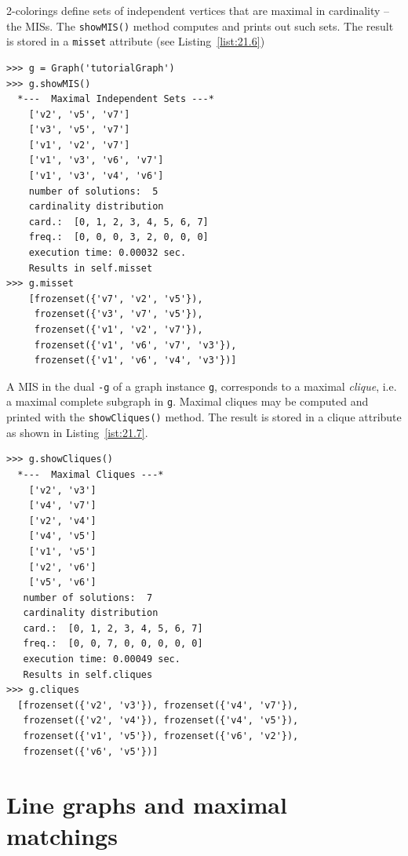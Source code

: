 2-colorings define sets of independent vertices that are maximal in cardinality --the MISs. The \texttt{showMIS()} method  computes and prints out such sets. The result is stored in a \texttt{misset} attribute (see Listing~\vref{list:21.6})
\begin{lstlisting}[caption={Computing and printing the maximal independent sets of graph \texttt{g}},label=list:21.6]
>>> g = Graph('tutorialGraph')
>>> g.showMIS()
  *---  Maximal Independent Sets ---*
    ['v2', 'v5', 'v7']
    ['v3', 'v5', 'v7']
    ['v1', 'v2', 'v7']
    ['v1', 'v3', 'v6', 'v7']
    ['v1', 'v3', 'v4', 'v6']
    number of solutions:  5
    cardinality distribution
    card.:  [0, 1, 2, 3, 4, 5, 6, 7]
    freq.:  [0, 0, 0, 3, 2, 0, 0, 0]
    execution time: 0.00032 sec.
    Results in self.misset
>>> g.misset
    [frozenset({'v7', 'v2', 'v5'}), 
     frozenset({'v3', 'v7', 'v5'}), 
     frozenset({'v1', 'v2', 'v7'}), 
     frozenset({'v1', 'v6', 'v7', 'v3'}), 
     frozenset({'v1', 'v6', 'v4', 'v3'})]
\end{lstlisting}

A MIS in the dual \texttt{-g} of a graph instance \texttt{g}, corresponds to a maximal \emph{clique}, i.e. a maximal complete subgraph in \texttt{g}. Maximal cliques may be computed and printed with the \texttt{showCliques()} method. The result is stored in a clique attribute as shown in Listing~\vref{ist:21.7}.
\begin{lstlisting}[caption={Computing and printing the maximal independent sets of graph \texttt{g}},label=list:21.7]
>>> g.showCliques()
  *---  Maximal Cliques ---*
    ['v2', 'v3']
    ['v4', 'v7']
    ['v2', 'v4']
    ['v4', 'v5']
    ['v1', 'v5']
    ['v2', 'v6']
    ['v5', 'v6']
   number of solutions:  7
   cardinality distribution
   card.:  [0, 1, 2, 3, 4, 5, 6, 7]
   freq.:  [0, 0, 7, 0, 0, 0, 0, 0]
   execution time: 0.00049 sec.
   Results in self.cliques
>>> g.cliques
  [frozenset({'v2', 'v3'}), frozenset({'v4', 'v7'}), 
   frozenset({'v2', 'v4'}), frozenset({'v4', 'v5'}), 
   frozenset({'v1', 'v5'}), frozenset({'v6', 'v2'}), 
   frozenset({'v6', 'v5'})]
\end{lstlisting}

\section{Line graphs and maximal matchings}
\label{sec:21.4}

